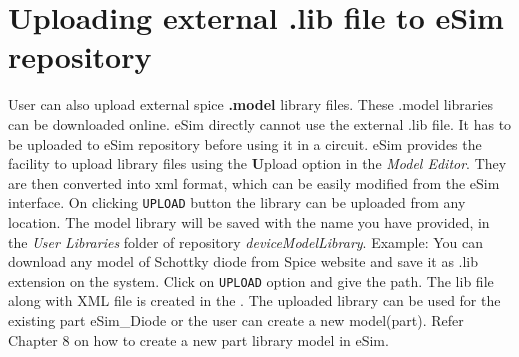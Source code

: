 \section{Uploading external .lib file to eSim repository}
User can also upload external spice {\textbf{.model}} library files. These .model libraries can be downloaded online.  eSim directly cannot use the external .lib file. It has to be uploaded to eSim repository before using it in a circuit.
eSim provides the facility to upload library files using the {\textbf Upload} option in the {\textit 
{Model Editor}}. They are then converted into xml format, which can be easily modified from the eSim interface.
On clicking {\tt UPLOAD} button the library can be uploaded from any location. The model library will be saved with the name you have provided, in the \textit {User Libraries} folder of repository \textit{deviceModelLibrary}.
Example: You can download any model of Schottky diode from Spice website and save it as .lib extension on the system. Click on  {\tt UPLOAD} option and give the path. The lib file along with XML file is created in the {}. The uploaded library can be used for the existing part eSim\_Diode or the user can create a new model(part). Refer Chapter 8 on how to create a new part library model in eSim.
